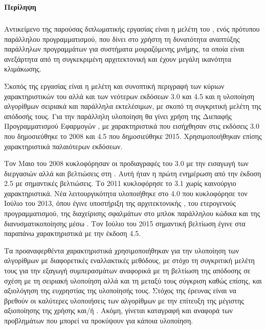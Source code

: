 
\clearpage
\begin{small}
\vfil
\end{small}



\clearpage
\begin{flushleft}
{\large \textbf{Περίληψη}}\\[0.5 cm]
\end{flushleft}

\subparagraph{}
Αντικείμενο της παρούσας διπλωματικής εργασίας είναι η μελέτη του , ενός πρότυπου παράλληλου προγραμματισμού, που δίνει στο χρήστη τη δυνατότητα αναπτύξης παράλληλων προγραμμάτων για συστήματα μοιραζόμενης μνήμης, τα οποία  είναι ανεξάρτητα από τη συγκεκριμένη αρχιτεκτονική και έχουν μεγάλη ικανότητα κλιμάκωσης\cite{pdplab}.

Σκοπός της εργασίας είναι η μελέτη και συνοπτική περιγραφή των κύριων χαρακτηριστικών του  αλλά και των νεότερων εκδόσεων 3.0 και 4.5 και η υλοποίηση αλγορίθμων σειριακά και παράλληλα εκτελέσιμων, με σκοπό τη συγκριτική μελέτη της απόδοσής τους. Για την παράλληλη υλοποίηση θα γίνει χρήση της Διεπαφής Προγραμματισμού Εφαρμογών , με χαρακτηριστικά που εισήχθησαν στις εκδόσεις  3.0 που δημοσιεύθηκε το 2008 και  4.5 που δημοσιεύθηκε 2015. Χρησιμοποιήθηκαν επίσης χαρακτηριστικά παλαιότερων εκδόσεων\cite{thenextstep59}.

Τον Μαιο του 2008 κυκλοφόρησαν οι προδιαγραφές του  3.0 με την εισαγωγή των διεργασιών  αλλά και βελτιώσεις στη . Αυτή ήταν η πρώτη ενημέρωση από την έκδοση 2.5 με σημαντικές βελτιώσεις. Το 2011 κυκλοφόρησε το  3.1 χωρίς καινούργιο χαρακτηριστικά. Νέα λειτουργικότητα υλοποιήθηκε στο  4.0 που κυκλοφόρησε τον Ιούλιο του 2013, όπου έγινε υποστήριξη της αρχιτεκτονικής , του ετερογενούς προγραμματισμού, της διαχείρισης σφαλμάτων στο μπλοκ παράλληλου κώδικα και της διανυσματικοποίησης μέσω . Τον Ιούλιο του 2015 σημαντική βελτίωση έγινε στα παραπάνω χαρακτηριστικά με την έκδοση  4.5\cite{thenextstep20}.

Τα προαναφερθέντα χαρακτηριστικά χρησιμοποιήθηκαν για την υλοποίηση των αλγορίθμων 
με διαφορετικές εναλλακτικές μεθόδους, με στόχο τη συγκριτική μελέτη τους για την εξαγωγή συμπερασμάτων αναφορικά με τη βελτίωση της απόδοσης σε σχέση με τη σειριακή υλοποίηση αλλά και τη μεταξύ τους σύγκριση καθώς επίσης, και αξιολόγηση της ευχρηστίας της υλοποίησής τους. Στόχος της έρευνας είναι να βρεθούν οι καλύτερες υλοποιήσεις των αλγορίθμων με την επίτευξη της μέγιστης αξιοποίησης της χρήσης  και/ή . Ακόμη, γίνεται καταγραφή και αναφορά των προβλημάτων που μπορεί να προκύψουν για κάποια υλοποίηση.

